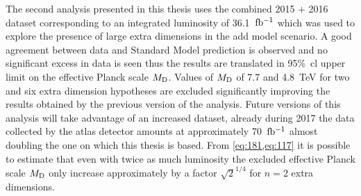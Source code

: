 The second analysis presented in this thesis uses the combined 2015 + 2016
dataset corresponding to an integrated luminosity of 36.1~$\mbox{fb$^{-1}$}$ which was used
to explore the presence of large extra dimensions in the \gls{add} model
scenario. A good agreement between data and Standard Model prediction is
observed and no significant excess in data is seen thus the results are
translated in 95\%~\gls{cl} upper limit on the effective Planck scale
$M_\mathrm{D}$. Values of $M_\mathrm{D}$ of 7.7 and 4.8~TeV for two and six extra dimension
hypotheses are excluded significantly improving the results obtained by the
previous version of the analysis. Future versions of this analysis will take
advantage of an increased dataset, already during 2017 the data collected by the
\gls{atlas} detector amounts at approximately 70~$\mbox{fb$^{-1}$}$ almost doubling the one
on which this thesis is based. From \cref{eq:181,eq:117} it is possible to
estimate that even with twice as much luminosity the excluded effective Planck
scale $M_\mathrm{D}$ only increase approximately by a factor $\sqrt{2}^{1/4}$ for $n = 2$
extra dimensions.

